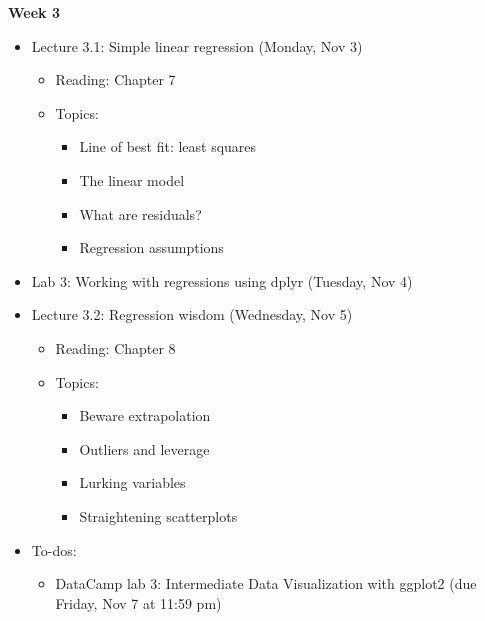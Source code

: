 \documentclass[11pt]{article}
\begin{document}
\textbf{Week 3}
\begin{itemize}
    \item Lecture 3.1: Simple linear regression (Monday, Nov 3)
    \begin{itemize}
        \item Reading: Chapter 7
        \item Topics:
        \begin{itemize}
            \item Line of best fit: least squares
            \item The linear model
            \item What are residuals?
            \item Regression assumptions
        \end{itemize}
    \end{itemize}
    \item Lab 3: Working with regressions using dplyr (Tuesday, Nov 4)
    \item Lecture 3.2: Regression wisdom (Wednesday, Nov 5)
    \begin{itemize}
        \item Reading: Chapter 8
        \item Topics:
        \begin{itemize}
            \item Beware extrapolation
            \item Outliers and leverage
            \item Lurking variables
            \item Straightening scatterplots
        \end{itemize}
    \end{itemize}
    \item To-dos:
    \begin{itemize}
        \item DataCamp lab 3: Intermediate Data Visualization with ggplot2 (due Friday, Nov 7 at 11:59 pm)
    \end{itemize}
\end{itemize}
\end{document}
